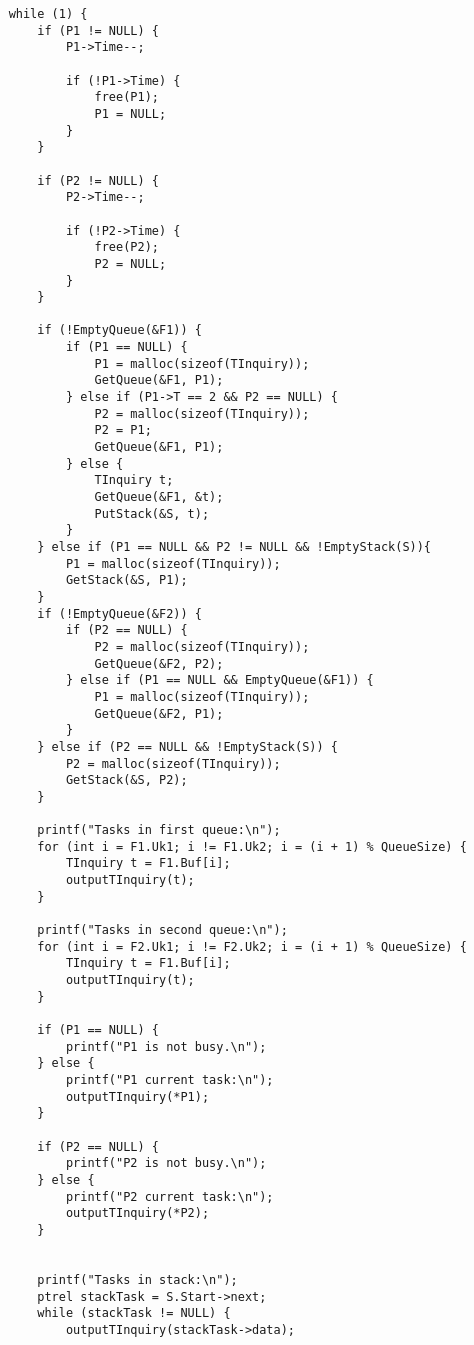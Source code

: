 \documentclass[a4paper,14pt]{extarticle}
\begin{document}
\begin{enumerate}
\begin{verbatim}
    while (1) {
        if (P1 != NULL) {
            P1->Time--;

            if (!P1->Time) {
                free(P1);
                P1 = NULL;
            }
        }
        
        if (P2 != NULL) {
            P2->Time--;

            if (!P2->Time) {
                free(P2);
                P2 = NULL;
            }
        }

        if (!EmptyQueue(&F1)) {
            if (P1 == NULL) {
                P1 = malloc(sizeof(TInquiry));
                GetQueue(&F1, P1);
            } else if (P1->T == 2 && P2 == NULL) {
                P2 = malloc(sizeof(TInquiry));
                P2 = P1;
                GetQueue(&F1, P1);
            } else {
                TInquiry t;
                GetQueue(&F1, &t);
                PutStack(&S, t);
            }
        } else if (P1 == NULL && P2 != NULL && !EmptyStack(S)){
            P1 = malloc(sizeof(TInquiry));
            GetStack(&S, P1);
        }
        if (!EmptyQueue(&F2)) {
            if (P2 == NULL) {
                P2 = malloc(sizeof(TInquiry));
                GetQueue(&F2, P2);
            } else if (P1 == NULL && EmptyQueue(&F1)) {
                P1 = malloc(sizeof(TInquiry));
                GetQueue(&F2, P1);
            }
        } else if (P2 == NULL && !EmptyStack(S)) {
            P2 = malloc(sizeof(TInquiry));
            GetStack(&S, P2);
        }

        printf("Tasks in first queue:\n");
        for (int i = F1.Uk1; i != F1.Uk2; i = (i + 1) % QueueSize) {
            TInquiry t = F1.Buf[i];
            outputTInquiry(t);
        }

        printf("Tasks in second queue:\n");
        for (int i = F2.Uk1; i != F2.Uk2; i = (i + 1) % QueueSize) {
            TInquiry t = F1.Buf[i];
            outputTInquiry(t);
        }
        
        if (P1 == NULL) {
            printf("P1 is not busy.\n");
        } else {
            printf("P1 current task:\n");
            outputTInquiry(*P1);
        }

        if (P2 == NULL) {
            printf("P2 is not busy.\n");
        } else {
            printf("P2 current task:\n");
            outputTInquiry(*P2);
        }

        
        printf("Tasks in stack:\n");
        ptrel stackTask = S.Start->next;
        while (stackTask != NULL) {
            outputTInquiry(stackTask->data);


\end{verbatim}
\end{enumerate}
\end{document}
